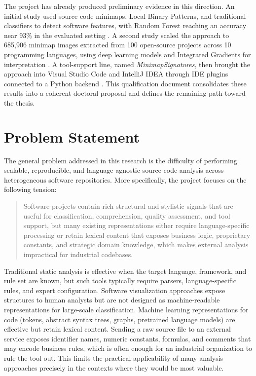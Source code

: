 The project has already produced preliminary evidence in this direction. An
initial study used source code minimaps, Local Binary Patterns, and traditional
classifiers to detect software features, with Random Forest reaching an
accuracy near 93\% in the evaluated setting \cite{gebara2025iwssip}. A second study
scaled the approach to 685,906 minimap images extracted from 100 open-source
projects across 10 programming languages, using deep learning models and
Integrated Gradients for interpretation \cite{gebara2025ciarp}. A tool-support
line, named \textit{MinimapSignatures}, then brought the approach into Visual
Studio Code and IntelliJ IDEA through IDE plugins connected to a Python backend
\cite{gebara2026minimapsignatures}. This qualification document consolidates
these results into a coherent doctoral proposal and defines the remaining path
toward the thesis.

\section{Problem Statement}

The general problem addressed in this research is the difficulty of performing
scalable, reproducible, and language-agnostic source code analysis across
heterogeneous software repositories. More specifically, the project focuses on
the following tension:

\begin{quote}
Software projects contain rich structural and stylistic signals that are useful
for classification, comprehension, quality assessment, and tool support, but
many existing representations either require language-specific processing or
retain lexical content that exposes business logic, proprietary constants, and
strategic domain knowledge, which makes external analysis impractical for
industrial codebases.
\end{quote}

Traditional static analysis is effective when the target language, framework,
and rule set are known, but such tools typically require parsers, language-specific
rules, and expert configuration. Software visualization approaches expose
structures to human analysts but are not designed as machine-readable
representations for large-scale classification. Machine learning representations
for code (tokens, abstract syntax trees, graphs, pretrained language models) are
effective but retain lexical content. Sending a raw source file to an external
service exposes identifier names, numeric constants, formulas, and comments
that may encode business rules, which is often enough for an industrial
organization to rule the tool out. This limits the practical applicability of
many analysis approaches precisely in the contexts where they would be most
valuable.

